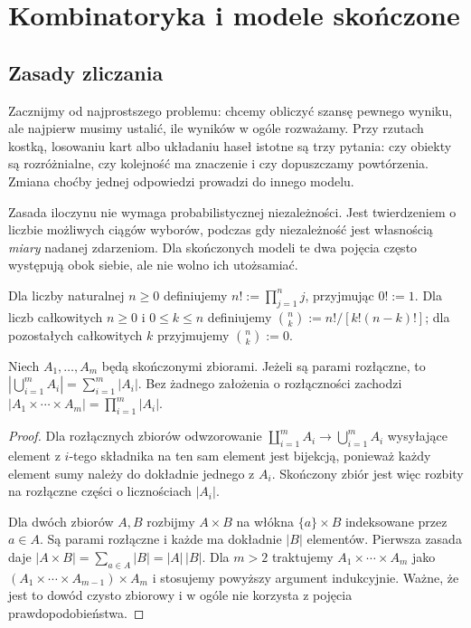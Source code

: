\chapter{Kombinatoryka i modele skończone}
\label{ch:combinatorics}

\section{Zasady zliczania}
Zacznijmy od najprostszego problemu: chcemy obliczyć szansę
pewnego wyniku, ale najpierw musimy ustalić, ile wyników w ogóle
rozważamy. Przy rzutach kostką, losowaniu kart albo układaniu haseł
istotne są trzy pytania: czy obiekty są rozróżnialne, czy kolejność
ma znaczenie i czy dopuszczamy powtórzenia. Zmiana choćby jednej
odpowiedzi prowadzi do innego modelu.

Zasada iloczynu nie wymaga probabilistycznej niezależności.
Jest twierdzeniem o liczbie możliwych ciągów wyborów, podczas gdy
niezależność jest własnością \emph{miary} nadanej zdarzeniom.
Dla skończonych modeli te dwa pojęcia często występują obok siebie,
ale nie wolno ich utożsamiać.

\begin{definicja}
Dla liczby naturalnej $n\geq 0$ definiujemy $n!:=\prod_{j=1}^n j$, przyjmując $0!:=1$.
Dla liczb całkowitych $n\geq0$ i $0\leq k\leq n$ definiujemy
$\binom nk:=n!/[k!(n-k)!]$; dla pozostałych całkowitych $k$ przyjmujemy
$\binom nk:=0$.
\end{definicja}

\begin{stwierdzenie}
Niech $A_1,\dots,A_m$ będą skończonymi zbiorami.
Jeżeli są parami rozłączne, to $|\bigcup_{i=1}^m A_i|=\sum_{i=1}^m|A_i|$.
Bez żadnego założenia o rozłączności zachodzi
$|A_1\times\cdots\times A_m|=\prod_{i=1}^m|A_i|$.
\end{stwierdzenie}
\begin{proof}
Dla rozłącznych zbiorów odwzorowanie
$\coprod_{i=1}^m A_i\to\bigcup_{i=1}^m A_i$
wysyłające element z $i$-tego składnika na ten sam element
jest bijekcją, ponieważ każdy element sumy należy do
dokładnie jednego z $A_i$. Skończony zbiór jest więc
rozbity na rozłączne części o licznościach $|A_i|$.

Dla dwóch zbiorów $A,B$ rozbijmy $A\times B$ na włókna
$\{a\}\times B$ indeksowane przez $a\in A$.
Są parami rozłączne i każde ma dokładnie $|B|$ elementów.
Pierwsza zasada daje
$|A\times B|=\sum_{a\in A}|B|=|A|\,|B|$.
Dla $m>2$ traktujemy
$A_1\times\cdots\times A_m$ jako
$(A_1\times\cdots\times A_{m-1})\times A_m$
i stosujemy powyższy argument indukcyjnie.
Ważne, że jest to dowód czysto zbiorowy i w ogóle
nie korzysta z pojęcia prawdopodobieństwa.
\end{proof}

